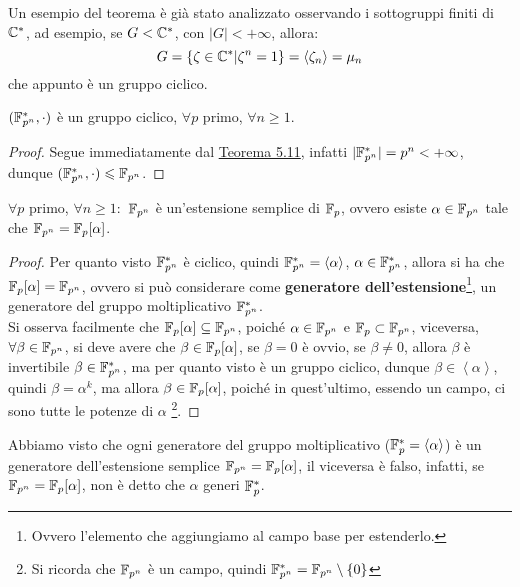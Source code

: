 \documentclass[11pt]{scrartcl}
\begin{document}
\begin{example}
	Un esempio del teorema è già stato analizzato osservando i sottogruppi finiti
	di $\mathbb C^*$, ad esempio, se $G < \mathbb C^*$, con $|G|<+\infty$, allora:
		\[ G=\{\zeta \in \mathbb C^* | \zeta^n = 1\} = \left<\zeta_n\right> = \mu_n
			\]
	che appunto è un gruppo ciclico.
\end{example}

\begin{corollary}
	$(\mathbb{F}_{p^{n}}^*, \cdot)$ è un gruppo ciclico, $\forall p$ primo, $\forall n \geq 1$.
\end{corollary}

\begin{proof}
	Segue immediatamente dal \hyperref[cf:5.11]{Teorema 5.11}, infatti $|\mathbb{F}_{p^{n}}^*| = p^n < +\infty$, dunque $(\mathbb{F}_{p^{n}}^*, \cdot) \leqslant \mathbb{F}_{p^{n}}$.
\end{proof}

\begin{corollary}
	$\forall p$ primo, $\forall n \geq 1:$ $\mathbb{F}_{p^{n}}$ è un'estensione semplice di ${\mathbb F}_p$, ovvero esiste $\alpha \in \mathbb{F}_{p^{n}}$ tale che $\mathbb{F}_{p^{n}} = {\mathbb F}_p[\alpha]$.
\end{corollary}

\begin{proof}
	Per quanto visto $\mathbb{F}_{p^{n}}^*$ è ciclico, quindi $\mathbb{F}_{p^{n}}^* = \left<\alpha\right>$, $\alpha \in \mathbb{F}_{p^{n}}^*$, allora si ha che 
	${\mathbb F}_p[\alpha] = \mathbb{F}_{p^{n}}$, ovvero si può considerare come \textbf{generatore dell'estensione}\footnote{Ovvero l'elemento che aggiungiamo al campo base per estenderlo.},
	 un generatore del gruppo moltiplicativo $\mathbb{F}_{p^{n}}^*$.\\
	 Si osserva facilmente che ${\mathbb F}_p[\alpha] \subseteq \mathbb{F}_{p^{n}}$, poiché $\alpha \in \mathbb{F}_{p^{n}}$ e ${\mathbb F}_p \subset \mathbb{F}_{p^{n}}$, viceversa,
	$\forall \beta \in \mathbb{F}_{p^{n}}$, si deve avere che $\beta \in {\mathbb F}_p[\alpha]$, se $\beta = 0$ è ovvio, se $\beta \ne 0$, allora $\beta$ è invertibile $\beta \in\mathbb{F}_{p^{n}}^*$, ma per quanto visto è un gruppo ciclico, 
	dunque $\beta \in \left<\alpha\right>$,
	quindi $\beta = \alpha^k$, ma allora $\beta \in {\mathbb F}_p[\alpha]$, poiché in quest'ultimo, essendo un campo, ci sono tutte le potenze di $\alpha$
	\footnote{Si ricorda che $\mathbb{F}_{p^{n}}$ è un campo, quindi $\mathbb{F}_{p^{n}}^* = \mathbb{F}_{p^{n}}\setminus\{0\}$}.
\end{proof}

\begin{remark}
	Abbiamo visto che ogni generatore del gruppo moltiplicativo (${\mathbb F}_p^* = \left<\alpha\right>$) è un generatore
	dell'estensione semplice $\mathbb{F}_{p^{n}} = {\mathbb F}_p[\alpha]$, il viceversa è falso, infatti, se $\mathbb{F}_{p^{n}} = {\mathbb F}_p[\alpha]$, non è detto che $\alpha$
	generi ${\mathbb F}_p^*$.
\end{remark}
\end{document}
